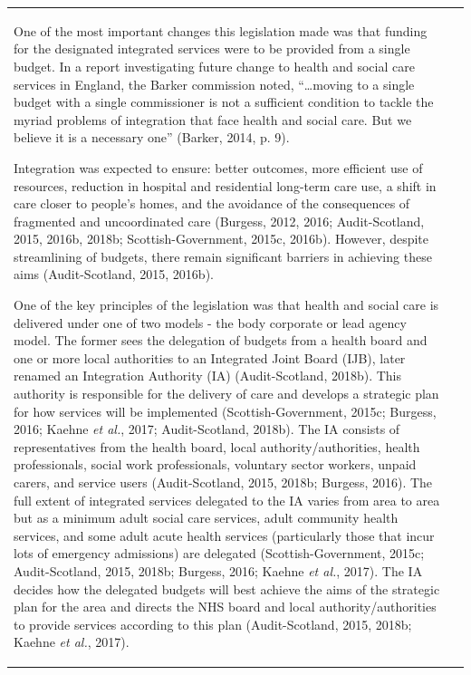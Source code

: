 \documentclass[12pt,a4paper,oneside,table]{report}
\begin{document}
\begin{tabular}[t]{ll}
One of the most important changes this legislation made was that funding
for the designated integrated services were to be provided from a single
budget. In a report investigating future change to health and social
care services in England, the Barker commission noted, ``\ldots moving
to a single budget with a single commissioner is not a sufficient
condition to tackle the myriad problems of integration that face health
and social care. But we believe it is a necessary one'' (Barker, 2014,
p. 9).

Integration was expected to ensure: better outcomes, more efficient use
of resources, reduction in hospital and residential long-term care use,
a shift in care closer to people's homes, and the avoidance of the
consequences of fragmented and uncoordinated care (Burgess, 2012, 2016;
Audit-Scotland, 2015, 2016b, 2018b; Scottish-Government, 2015c, 2016b).
However, despite streamlining of budgets, there remain significant
barriers in achieving these aims (Audit-Scotland, 2015, 2016b).

One of the key principles of the legislation was that health and social
care is delivered under one of two models - the body corporate or lead
agency model. The former sees the delegation of budgets from a health
board and one or more local authorities to an Integrated Joint Board
(IJB), later renamed an Integration Authority (IA) (Audit-Scotland,
2018b). This authority is responsible for the delivery of care and
develops a strategic plan for how services will be implemented
(Scottish-Government, 2015c; Burgess, 2016; Kaehne \emph{et al.}, 2017;
Audit-Scotland, 2018b). The IA consists of representatives from the
health board, local authority/authorities, health professionals, social
work professionals, voluntary sector workers, unpaid carers, and service
users (Audit-Scotland, 2015, 2018b; Burgess, 2016). The full extent of
integrated services delegated to the IA varies from area to area but as
a minimum adult social care services, adult community health services,
and some adult acute health services (particularly those that incur lots
of emergency admissions) are delegated (Scottish-Government, 2015c;
Audit-Scotland, 2015, 2018b; Burgess, 2016; Kaehne \emph{et al.}, 2017).
The IA decides how the delegated budgets will best achieve the aims of
the strategic plan for the area and directs the NHS board and local
authority/authorities to provide services according to this plan
(Audit-Scotland, 2015, 2018b; Kaehne \emph{et al.}, 2017).


\end{tabular}
\end{document}

